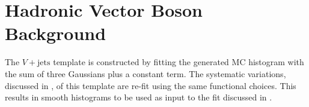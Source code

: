 \section{Hadronic Vector Boson Background} \label{sec:background:vqq}

The $V+\text{jets}$ template is constructed by fitting the generated MC
histogram with the sum of three Gaussians plus a constant term.  The systematic
variations, discussed in , of this template are re-fit
using the same functional choices.  This results in smooth histograms to be
used as input to the fit discussed in .
